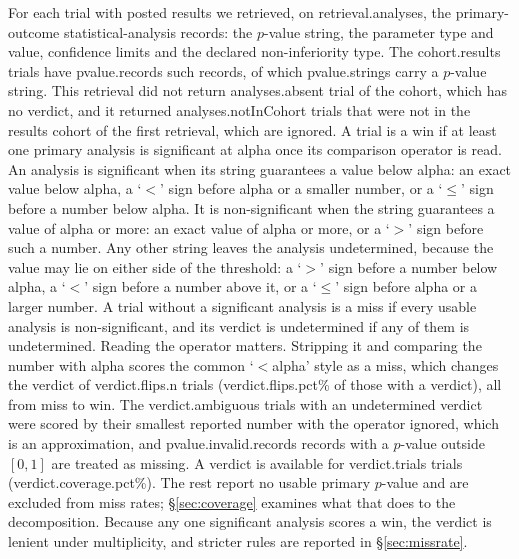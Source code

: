 \documentclass[11pt]{article}
\begin{document}
For each trial with posted results we retrieved, on \num{retrieval.analyses}, the primary-outcome statistical-analysis records: the $p$-value string, the parameter type and value, confidence limits and the declared non-inferiority type. The \num{cohort.results} trials have \num{pvalue.records} such records, of which \num{pvalue.strings} carry a $p$-value string. This retrieval did not return \num{analyses.absent} trial of the cohort, which has no verdict, and it returned \num{analyses.notInCohort} trials that were not in the results cohort of the first retrieval, which are ignored. A trial is a win if at least one primary analysis is significant at \num{alpha} once its comparison operator is read. An analysis is significant when its string guarantees a value below \num{alpha}: an exact value below \num{alpha}, a `$<$' sign before \num{alpha} or a smaller number, or a `$\le$' sign before a number below \num{alpha}. It is non-significant when the string guarantees a value of \num{alpha} or more: an exact value of \num{alpha} or more, or a `$>$' sign before such a number. Any other string leaves the analysis undetermined, because the value may lie on either side of the threshold: a `$>$' sign before a number below \num{alpha}, a `$<$' sign before a number above it, or a `$\le$' sign before \num{alpha} or a larger number. A trial without a significant analysis is a miss if every usable analysis is non-significant, and its verdict is undetermined if any of them is undetermined. Reading the operator matters. Stripping it and comparing the number with \num{alpha} scores the common `$<$\num{alpha}' style as a miss, which changes the verdict of \num{verdict.flips.n} trials (\num{verdict.flips.pct}\% of those with a verdict), all from miss to win. The \num{verdict.ambiguous} trials with an undetermined verdict were scored by their smallest reported number with the operator ignored, which is an approximation, and \num{pvalue.invalid.records} records with a $p$-value outside $[0, 1]$ are treated as missing. A verdict is available for \num{verdict.trials} trials (\num{verdict.coverage.pct}\%). The rest report no usable primary $p$-value and are excluded from miss rates; \S\ref{sec:coverage} examines what that does to the decomposition. Because any one significant analysis scores a win, the verdict is lenient under multiplicity, and stricter rules are reported in \S\ref{sec:missrate}.
\end{document}
